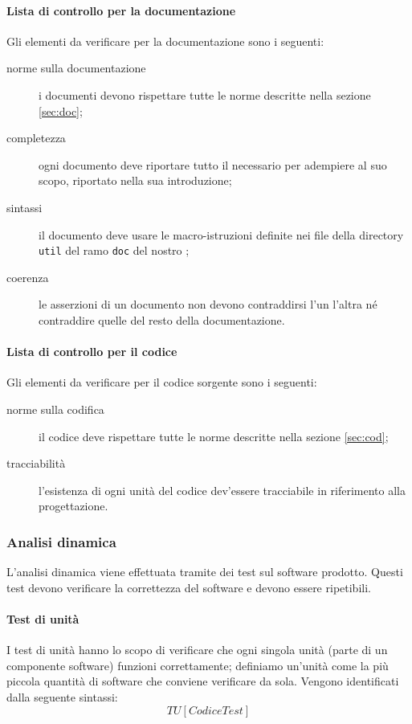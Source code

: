 	\paragraph{Lista di controllo per la documentazione} Gli elementi da verificare per la documentazione sono i seguenti:
	\begin{description} %
		\item[norme sulla documentazione] i documenti devono rispettare tutte le norme descritte nella sezione \ref{sec:doc};
		\item[completezza] ogni documento deve riportare tutto il necessario per adempiere al suo scopo, riportato nella sua introduzione;
		\item[sintassi ] il documento deve usare le macro-istruzioni definite nei file della directory \texttt{util} del ramo \texttt{doc} del nostro ;
		\item[coerenza] le asserzioni di un documento non devono contraddirsi l'un l'altra né contraddire quelle del resto della documentazione.
	\end{description}
	\paragraph{Lista di controllo per il codice} Gli elementi da verificare per il codice sorgente sono i seguenti:
	\begin{description} %
		\item[norme sulla codifica] il codice deve rispettare tutte le norme descritte nella sezione \ref{sec:cod};
		\item[tracciabilità] l'esistenza di ogni unità del codice dev'essere tracciabile in riferimento alla progettazione.
	\end{description}
 
	\subsubsection{Analisi dinamica}
	L'analisi dinamica viene effettuata tramite dei test sul software prodotto. Questi test devono verificare la correttezza del software e devono essere ripetibili.
	\paragraph{Test di unità}
		I test di unità hanno lo scopo di verificare che ogni singola unità (parte di un componente software) funzioni correttamente; definiamo un'unità come la più piccola quantità di software che conviene verificare da sola. Vengono identificati dalla seguente sintassi:
			\[TU[Codice Test]\]
